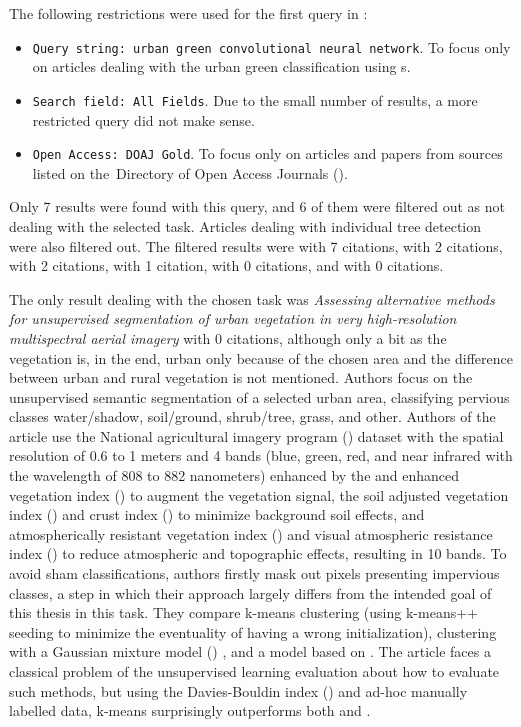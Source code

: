 The following restrictions were used for the first query in :

\begin{itemize}
	\item \verb|Query string: urban green convolutional neural network|. To focus only on articles dealing with the urban green classification using s.
	\item \verb|Search field: All Fields|. Due to the small number of results, a more restricted query did not make sense.
	\item \verb|Open Access: DOAJ Gold|. To focus only on articles and papers from sources listed on the~Di\-rectory of Open Access Journals ().
\end{itemize}

\noindent Only 7 results were found with this query, and 6 of them were filtered out as not dealing with the selected task. Articles dealing with individual tree detection were also filtered out. The filtered results were \cite{tree-detection-uav-cnn} with 7 citations, \cite{cascaded-cnn-trees} with 2 citations, \cite{window-zooming-fruit} with 2 citations, \cite{urban-green-quantification} with 1 citation, \cite{urban-green-obesity} with 0 citations, and \cite{urban-green-contamination} with 0 citations.

The only result dealing with the chosen task was \textit{Assessing alternative methods for unsupervised segmentation of urban vegetation in very high-resolution multispectral aerial imagery} \cite{urban-green-unsupervised-aerial} with 0 citations, although only a bit as the vegetation is, in the end, urban only because of the chosen area and the difference between urban and rural vegetation is not mentioned. Authors focus on the unsupervised semantic segmentation of a selected urban area, classifying pervious classes water/shadow, soil/ground, shrub/tree, grass, and other. Authors of the article use the National agricultural imagery program () dataset with the spatial resolution of 0.6 to 1 meters and 4 bands (blue, green, red, and near infrared with the wavelength of 808 to 882 nanometers) enhanced by the  and enhanced vegetation index () to augment the vegetation signal, the soil adjusted vegetation index () and crust index () to minimize background soil effects, and atmospherically resistant vegetation index () and visual atmospheric resistance index () to reduce atmospheric and topographic effects, resulting in 10 bands. To avoid sham classifications, authors firstly mask out pixels presenting impervious classes, a step in which their approach largely differs from the intended goal of this thesis in this task. They compare k-means clustering \cite{k-means} (using k-means++ seeding \cite{k-means-plusplus} to minimize the eventuality of having a wrong initialization), clustering with a Gaussian mixture model () \cite{gmm}, and a  model based on \cite{cnn-hs-unsupervised-fuzzy}. The article faces a classical problem of the unsupervised learning evaluation about how to evaluate such methods, but using the Davies-Bouldin index () \cite{dbi} and ad-hoc manually labelled data, k-means surprisingly outperforms both  and .

